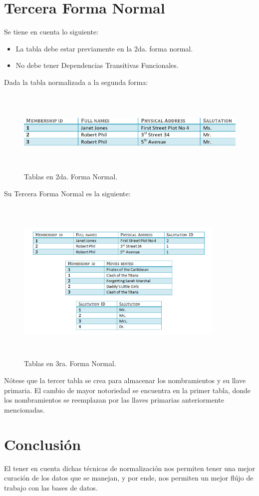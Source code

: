 \documentclass[letterpaper, 12pt]{article}
\begin{document}
\begin{justify}
        \section{Tercera Forma Normal}
        \justify
        Se tiene en cuenta lo siguiente:
        \begin{itemize}
            \item La tabla debe estar previamente en la 2da. forma normal.
            \item No debe tener Dependencias Transitivas Funcionales.
        \end{itemize}
        Dada la tabla normalizada a la segunda forma:
        \begin{figure}[H]
            \centering
            \includegraphics[width=14cm,height=4cm]{2NF.png}
            \caption{Tablas en 2da. Forma Normal.}
        \end{figure}
        \justify
        Su Tercera Forma Normal es la siguiente:
        \begin{figure}[H]
            \centering
            \includegraphics[width=10cm,height=8cm]{3NF.png}
            \caption{Tablas en 3ra. Forma Normal.}
        \end{figure}
        \justify
        Nótese que la tercer tabla se crea para almacenar los nombramientos y su llave primaria. El cambio de mayor notoriedad se encuentra en la
        primer tabla, donde los nombramientos se reemplazan por las llaves primarias anteriormente mencionadas.
        \section{Conclusión}
        \justify  
        El tener en cuenta dichas técnicas de normalización nos permiten tener una mejor curación de los datos que se manejan, y por ende, nos permiten
        un mejor flújo de trabajo con las bases de datos.
    \end{justify}
\end{document}
